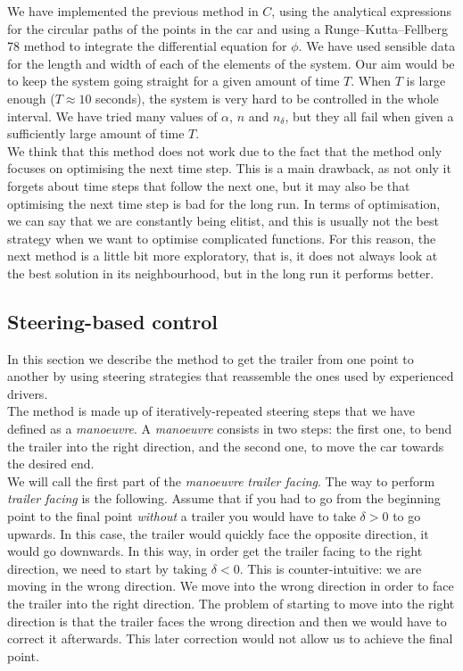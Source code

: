 We have implemented the previous method in $C$, using the analytical expressions for the circular paths of the points in the car and using a Runge--Kutta--Fellberg 78 method to integrate the differential equation for $\phi$. We have used sensible data for the length and width of each of the elements of the system.  Our aim would be to keep the system going straight for a given amount of time $T$. When $T$ is large enough ($T\approx 10$ seconds), the system is very hard to be controlled in the whole interval. We have tried many values of $\alpha$, $n$ and $n_\delta$, but they all fail when given a sufficiently large amount of time $T$.\\


We think that this method does not work due to the fact that the method only focuses on optimising the next time step. This is a main drawback, as not only it forgets about time steps that follow the next one, but it may also be that optimising the next time step is bad for the long run. In terms of optimisation, we can say that we are constantly being elitist, and this is usually not the best strategy when we want to optimise complicated functions. For this reason, the next method is a little bit more exploratory, that is, it does not always look at the best solution in its neighbourhood, but in the long run it performs better.\\

\subsection{Steering-based control}
In this section we describe the method to get the trailer from one point to another by using steering strategies that reassemble the ones used by experienced drivers.\\

The method is made up of iteratively-repeated steering steps that we have defined as a \textit{manoeuvre}. A \textit{manoeuvre} consists in two steps: the first one, to bend the trailer into the right direction, and the second one, to move the car towards the desired end.\\

We will call the first part of the \textit{manoeuvre} \emph{trailer facing}. The way to perform \emph{trailer facing} is the following. Assume that if you had to go from the beginning point to the final point \textit{without} a trailer you would have to take $\delta > 0$ to go upwards. In this case, the trailer would quickly face the opposite direction, it would go downwards. In this way, in order get the trailer facing to the right direction, we need to start by taking $\delta < 0$. This is counter-intuitive: we are moving in the wrong direction. We move into the wrong direction in order to face the trailer into the right direction. The problem of starting to move into the right direction is that the trailer faces the wrong direction and then we would have to correct it afterwards. This later correction would not allow us to achieve the final point.\\

